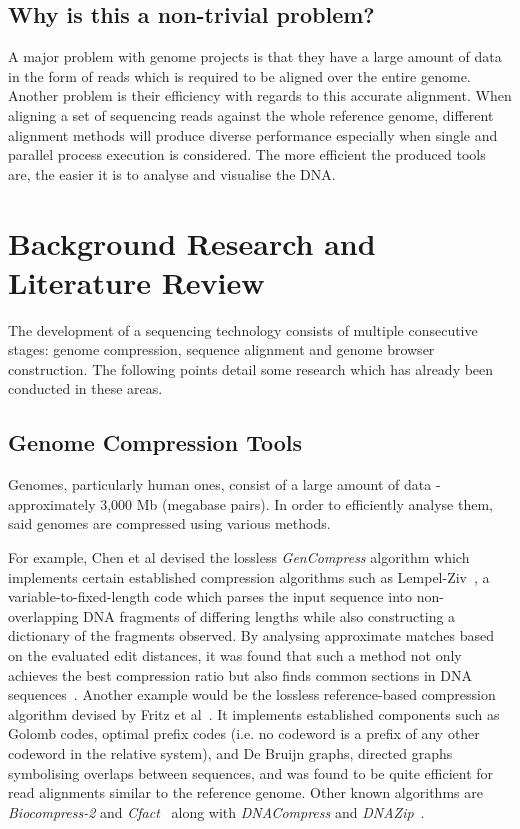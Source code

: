 \documentclass{csfyp}
\begin{document}
\begin{small}
\subsection{Why is this a non-trivial problem?}\vspace{-4ex}
A major problem with genome projects is that they have a large amount of data in the form of reads which is required to be aligned over the entire genome.  Another problem is their efficiency with regards to this accurate alignment.  When aligning a set of sequencing reads against the whole reference genome, different alignment methods will produce diverse performance especially when single and parallel process execution is considered.  The more efficient the produced tools are, the easier it is to analyse and visualise the DNA.     


\section{Background Research and Literature Review}\vspace{-3ex}

The development of a sequencing technology consists of multiple consecutive stages: genome compression, sequence alignment and genome browser construction.  The following points detail some research which has already been conducted in these areas.

\subsection{Genome Compression Tools}\vspace{-4ex}
Genomes, particularly human ones, consist of a large amount of data - approximately 3,000 Mb (megabase pairs).  In order to efficiently analyse them, said genomes are compressed using various methods.  

For example, Chen et al devised the lossless {\textit{GenCompress}} algorithm which implements certain established compression algorithms such as Lempel-Ziv~\cite{gencompress}, a variable-to-fixed-length code which parses the input sequence into non-overlapping DNA fragments of differing lengths while also constructing a dictionary of the fragments observed.    By analysing approximate matches based on the evaluated edit distances, it was found that such a method not only achieves the best compression ratio but also finds common sections in DNA sequences~\cite{gencompress}.  Another example would be the lossless reference-based compression algorithm devised by Fritz et al~\cite{refcompression}.  It implements established components such as Golomb codes, optimal prefix codes (i.e. no codeword is a prefix of any other codeword in the relative system), and De Bruijn graphs, directed graphs symbolising overlaps between sequences, and was found to be quite efficient for read alignments similar to the reference genome.  Other known algorithms are {\textit{Biocompress-2}} and {\textit{Cfact}}~\cite{gencompress} along with {\textit{DNACompress}} and {\textit{ DNAZip}}~\cite{refcompression}.          


\end{small}
\end{document}
